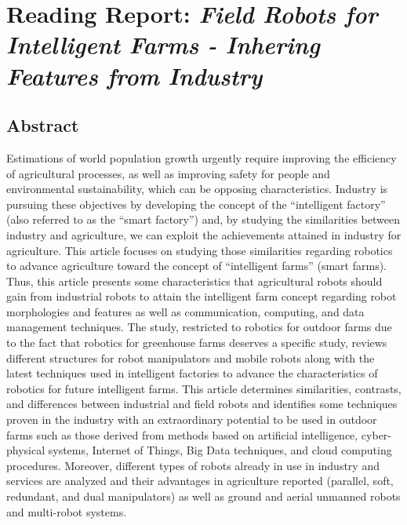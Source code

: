 \documentclass{article}
\begin{document}


\section{Reading Report: \emph{Field Robots for Intelligent Farms - Inhering Features from Industry}}
\cite{deSantos2020}

\subsection*{Abstract}
Estimations of world population growth urgently require improving the efficiency of
agricultural processes, as well as improving safety for people and environmental sustainability,
which can be opposing characteristics. Industry is pursuing these objectives by developing the
concept of the “intelligent factory” (also referred to as the “smart factory”) and, by studying the
similarities between industry and agriculture, we can exploit the achievements attained in industry
for agriculture. This article focuses on studying those similarities regarding robotics to advance
agriculture toward the concept of “intelligent farms” (smart farms). Thus, this article presents some
characteristics that agricultural robots should gain from industrial robots to attain the intelligent farm
concept regarding robot morphologies and features as well as communication, computing, and data
management techniques. The study, restricted to robotics for outdoor farms due to the fact that robotics
for greenhouse farms deserves a specific study, reviews different structures for robot manipulators and
mobile robots along with the latest techniques used in intelligent factories to advance the characteristics
of robotics for future intelligent farms. This article determines similarities, contrasts, and differences
between industrial and field robots and identifies some techniques proven in the industry with an
extraordinary potential to be used in outdoor farms such as those derived from methods based on
artificial intelligence, cyber-physical systems, Internet of Things, Big Data techniques, and cloud
computing procedures. Moreover, different types of robots already in use in industry and services
are analyzed and their advantages in agriculture reported (parallel, soft, redundant, and dual
manipulators) as well as ground and aerial unmanned robots and multi-robot systems.
\end{document}
